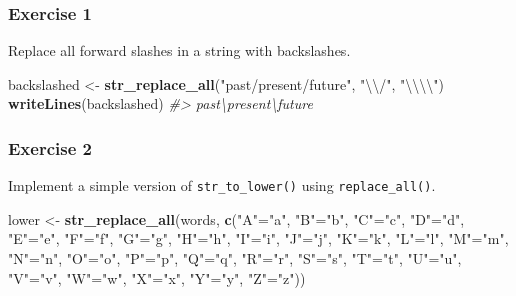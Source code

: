 \documentclass[]{book}
\newenvironment{Shaded}{\begin{snugshade}}{\end{snugshade}}
\newcommand{\CharTok}[1]{\textcolor[rgb]{0.31,0.60,0.02}{#1}}
\newcommand{\CommentTok}[1]{\textcolor[rgb]{0.56,0.35,0.01}{\textit{#1}}}
\newcommand{\KeywordTok}[1]{\textcolor[rgb]{0.13,0.29,0.53}{\textbf{#1}}}
\newcommand{\NormalTok}[1]{#1}
\newcommand{\StringTok}[1]{\textcolor[rgb]{0.31,0.60,0.02}{#1}}
\theoremstyle{definition}
\theoremstyle{definition}
\theoremstyle{definition}
\theoremstyle{remark}
\begin{document}
\hypertarget{exercise-1-34}{%
\subsubsection{Exercise 1}\label{exercise-1-34}}

Replace all forward slashes in a string with backslashes.

\begin{Shaded}
\begin{Highlighting}[]
\NormalTok{backslashed <-}\StringTok{ }\KeywordTok{str_replace_all}\NormalTok{(}\StringTok{"past/present/future"}\NormalTok{, }\StringTok{"}\CharTok{\textbackslash{}\textbackslash{}}\StringTok{/"}\NormalTok{, }\StringTok{"}\CharTok{\textbackslash{}\textbackslash{}\textbackslash{}\textbackslash{}}\StringTok{"}\NormalTok{)}
\KeywordTok{writeLines}\NormalTok{(backslashed)}
\CommentTok{#> past\textbackslash{}present\textbackslash{}future}
\end{Highlighting}
\end{Shaded}

\hypertarget{exercise-2-33}{%
\subsubsection{Exercise 2}\label{exercise-2-33}}

Implement a simple version of \texttt{str\_to\_lower()} using
\texttt{replace\_all()}.

\begin{Shaded}
\begin{Highlighting}[]
\NormalTok{lower <-}\StringTok{ }\KeywordTok{str_replace_all}\NormalTok{(words, }\KeywordTok{c}\NormalTok{(}\StringTok{"A"}\NormalTok{=}\StringTok{"a"}\NormalTok{, }\StringTok{"B"}\NormalTok{=}\StringTok{"b"}\NormalTok{, }\StringTok{"C"}\NormalTok{=}\StringTok{"c"}\NormalTok{, }\StringTok{"D"}\NormalTok{=}\StringTok{"d"}\NormalTok{, }\StringTok{"E"}\NormalTok{=}\StringTok{"e"}\NormalTok{, }\StringTok{"F"}\NormalTok{=}\StringTok{"f"}\NormalTok{, }\StringTok{"G"}\NormalTok{=}\StringTok{"g"}\NormalTok{, }\StringTok{"H"}\NormalTok{=}\StringTok{"h"}\NormalTok{, }\StringTok{"I"}\NormalTok{=}\StringTok{"i"}\NormalTok{, }\StringTok{"J"}\NormalTok{=}\StringTok{"j"}\NormalTok{, }\StringTok{"K"}\NormalTok{=}\StringTok{"k"}\NormalTok{, }\StringTok{"L"}\NormalTok{=}\StringTok{"l"}\NormalTok{, }\StringTok{"M"}\NormalTok{=}\StringTok{"m"}\NormalTok{, }\StringTok{"N"}\NormalTok{=}\StringTok{"n"}\NormalTok{, }\StringTok{"O"}\NormalTok{=}\StringTok{"o"}\NormalTok{, }\StringTok{"P"}\NormalTok{=}\StringTok{"p"}\NormalTok{, }\StringTok{"Q"}\NormalTok{=}\StringTok{"q"}\NormalTok{, }\StringTok{"R"}\NormalTok{=}\StringTok{"r"}\NormalTok{, }\StringTok{"S"}\NormalTok{=}\StringTok{"s"}\NormalTok{, }\StringTok{"T"}\NormalTok{=}\StringTok{"t"}\NormalTok{, }\StringTok{"U"}\NormalTok{=}\StringTok{"u"}\NormalTok{, }\StringTok{"V"}\NormalTok{=}\StringTok{"v"}\NormalTok{, }\StringTok{"W"}\NormalTok{=}\StringTok{"w"}\NormalTok{, }\StringTok{"X"}\NormalTok{=}\StringTok{"x"}\NormalTok{, }\StringTok{"Y"}\NormalTok{=}\StringTok{"y"}\NormalTok{, }\StringTok{"Z"}\NormalTok{=}\StringTok{"z"}\NormalTok{))}
\end{Highlighting}
\end{Shaded}
\end{document}
